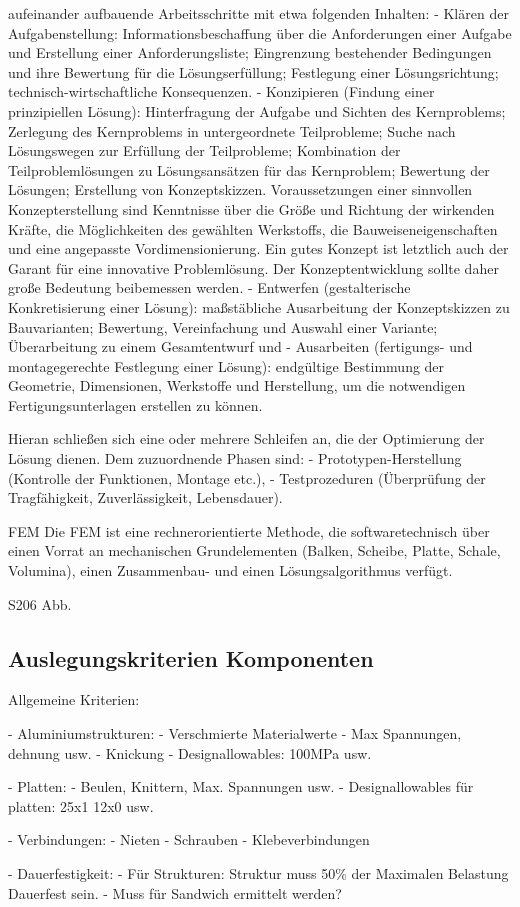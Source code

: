 aufeinander aufbauende Arbeitsschritte mit etwa folgenden Inhalten:
  - Klären der Aufgabenstellung: Informationsbeschaffung über die Anforderungen einer Aufgabe und Erstellung einer Anforderungsliste; Eingrenzung bestehender Bedingungen und ihre Bewertung für die Lösungserfüllung; Festlegung einer Lösungsrichtung; technisch-wirtschaftliche Konsequenzen.
  - Konzipieren (Findung einer prinzipiellen Lösung): Hinterfragung der Aufgabe und Sichten des Kernproblems; Zerlegung des Kernproblems in untergeordnete Teilprobleme; Suche nach Lösungswegen zur Erfüllung der Teilprobleme; Kombination der Teilproblemlösungen zu Lösungsansätzen für das Kernproblem; Bewertung der Lösungen; Erstellung von Konzeptskizzen.  Voraussetzungen einer sinnvollen Konzepterstellung sind Kenntnisse über die Größe und Richtung der wirkenden Kräfte, die Möglichkeiten des gewählten Werkstoffs, die Bauweiseneigenschaften und eine angepasste Vordimensionierung. Ein gutes Konzept ist letztlich auch der Garant für eine innovative Problemlösung. Der Konzeptentwicklung sollte daher große Bedeutung beibemessen werden.
  - Entwerfen (gestalterische Konkretisierung einer Lösung): maßstäbliche Ausarbeitung der Konzeptskizzen zu Bauvarianten; Bewertung, Vereinfachung und Auswahl einer Variante; Überarbeitung zu einem Gesamtentwurf und
  - Ausarbeiten (fertigungs- und montagegerechte Festlegung einer Lösung): endgültige Bestimmung der Geometrie, Dimensionen, Werkstoffe und Herstellung, um die notwendigen Fertigungsunterlagen erstellen zu können.

Hieran schließen sich eine oder mehrere Schleifen an, die der Optimierung der Lösung dienen. Dem zuzuordnende Phasen sind:
  - Prototypen-Herstellung (Kontrolle der Funktionen, Montage etc.),
  - Testprozeduren (Überprüfung der Tragfähigkeit, Zuverlässigkeit, Lebensdauer).

FEM
  Die FEM ist eine rechnerorientierte Methode, die softwaretechnisch über einen Vorrat an mechanischen Grundelementen (Balken, Scheibe, Platte, Schale, Volumina), einen Zusammenbau- und einen Lösungsalgorithmus verfügt.

S206 Abb.


\subsection{Auslegungskriterien Komponenten}
Allgemeine Kriterien: 

- Aluminiumstrukturen:
  - Verschmierte Materialwerte
  - Max Spannungen, dehnung usw.
  - Knickung
  - Designallowables: 100MPa usw.

- Platten:
  - Beulen, Knittern, Max. Spannungen usw.
  - Designallowables für platten: 25x1 12x0 usw.

- Verbindungen:
  - Nieten
  - Schrauben
  - Klebeverbindungen

- Dauerfestigkeit:
  - Für Strukturen: Struktur muss 50\% der Maximalen Belastung Dauerfest sein.
  - Muss für Sandwich ermittelt werden?


\newpage
